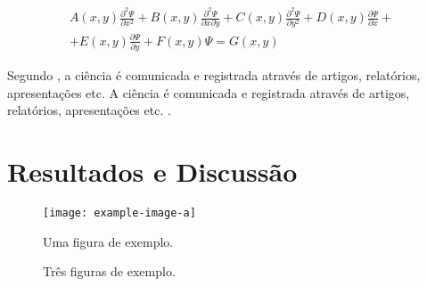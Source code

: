 \documentclass[10pt]{article}
\begin{document}
\lipsum[6]

\begin{multline} 
    A(x,y)\frac{\partial^2{\Psi}}{\partial{x^2}} +
    B(x,y)\frac{\partial^2{\Psi}}{\partial{x}\partial{y}} +
    C(x,y)\frac{\partial^2{\Psi}}{\partial{y^2}} +
    D(x,y)\frac{\partial{\Psi}}{\partial{x}} + \\ +
    E(x,y)\frac{\partial{\Psi}}{\partial{y}} + F(x,y)\Psi = G(x,y)
\end{multline}

\lipsum[7]

Segundo , a ciência é comunicada e registrada através de artigos, relatórios, apresentações etc. A ciência é comunicada e registrada através de artigos, relatórios, apresentações etc. \cite{ciclanoetal/1975,fulano/1964}.

\section{Resultados e Discussão}

\lipsum[8]

\begin{figure}[H]
    \centering
    \texttt{[image: example-image-a]}
    \caption{Uma figura de exemplo.}
    \label{fig:my_label1}
\end{figure}

\lipsum[9-10]

\begin{figure}[H]
    \centering
    \caption{Três figuras de exemplo.}
    \label{fig:my_label2}
\end{figure}

\lipsum[11-11]


\end{document}
